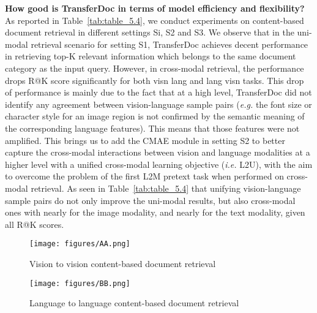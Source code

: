 \documentclass[preprint,review,12pt]{elsarticle}
\newcommand{\ie}{\textit{i.e. }}
\newcommand{\eg}{\textit{e.g. }}
\begin{document}
\noindent\textbf{How good is TransferDoc in terms of model efficiency and flexibility?} As reported in Table~\ref{tab:table_5.4}, we conduct experiments on content-based document retrieval in different settings Si, S2 and S3. We observe that in the uni-modal retrieval scenario for setting S1, TransferDoc achieves decent performance in retrieving top-K relevant information which belongs to the same document category as the input query. 
However, in cross-modal retrieval, the performance drops R@K score significantly for both visn  lang and lang  visn tasks. This drop of performance is mainly due to the fact that at a high level, TransferDoc did not identify any agreement between vision-language sample pairs (\eg the font size or character style for an image region is not confirmed by the semantic meaning of the corresponding language features). This means that those features were not amplified. This brings us to add the CMAE module in setting S2 to better capture the cross-modal interactions between vision and language modalities at a higher level with a unified cross-modal learning objective (\ie L2U), with the aim to overcome the problem of the first L2M pretext task when performed on cross-modal retrieval. As seen in Table~\ref{tab:table_5.4} that unifying vision-language sample pairs do not only improve the uni-modal results, but also cross-modal ones with nearly  for the image modality, and nearly  for the text modality, given all R@K scores. 
\begin{figure*}[t!]
\centering
\begin{subfigure}{\textwidth}
  {
  \texttt{[image: figures/AA.png]}}\quad
  \caption{Vision to vision content-based document retrieval}
  \label{fig:vision_to_vision_retrieval}
\end{subfigure}
\hfill
\begin{subfigure}{\textwidth}
  {
  \texttt{[image: figures/BB.png]}}\quad
  \caption{Language to language content-based document retrieval}
  \label{fig:language_to_language_retrieval}
\end{subfigure}
\caption{\textbf{Representative uni-modal retrieval samples of the pre-trained TransferDoc model.} Zoom in for better visualization. The first column represents the input example query randomly selected from the test set of RVL-CDIP, and the top-5 retrievals are shown in following columns in order. Red and green borders are used to depict the incorrect and correct classes of retrieved documents respectively. For each task setting (\ie Vision  Vision and Language  Language, the same input example query is used.}
\label{fig:figure_3.3}
\end{figure*}
\end{document}
